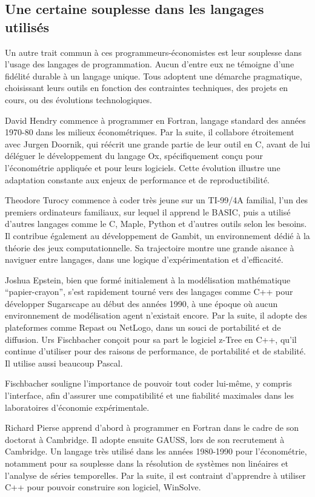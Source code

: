\subsection{Une certaine souplesse dans les langages utilisés}

Un autre trait commun à ces programmeurs-économistes est leur souplesse dans l’usage des langages de programmation. Aucun d’entre eux ne témoigne d'une fidélité durable à un langage unique. Tous adoptent une démarche pragmatique, choisissant leurs outils en fonction des contraintes techniques, des projets en cours, ou des évolutions technologiques. 

David Hendry commence à programmer en Fortran, langage standard des années 1970-80 dans les milieux économétriques. Par la suite, il collabore étroitement avec Jurgen Doornik, qui réécrit une grande partie de leur outil en C, avant de lui déléguer le développement du langage Ox, spécifiquement conçu pour l’économétrie appliquée et pour leurs logiciels. Cette évolution illustre une adaptation constante aux enjeux de performance et de reproductibilité. 

Theodore Turocy commence à coder très jeune sur un TI-99/4A familial, l'un des premiers ordinateurs familiaux, sur lequel il apprend le BASIC, puis a utilisé d'autres langages comme le C, Maple, Python et d’autres outils selon les besoins. Il contribue également au développement de Gambit, un environnement dédié à la théorie des jeux computationnelle. Sa trajectoire montre une grande aisance à naviguer entre langages, dans une logique d’expérimentation et d’efficacité. 

Joshua Epstein, bien que formé initialement à la modélisation mathématique “papier-crayon”, s’est rapidement tourné vers des langages comme C++ pour développer Sugarscape au début des années 1990, à une époque où aucun environnement de modélisation agent n’existait encore. Par la suite, il adopte des plateformes comme Repast ou NetLogo, dans un souci de portabilité et de diffusion. Urs Fischbacher conçoit pour sa part le logiciel z-Tree en C++, qu’il continue d’utiliser pour des raisons de performance, de portabilité et de stabilité. Il utilise aussi beaucoup Pascal. 

Fischbacher souligne l’importance de pouvoir tout coder lui-même, y compris l’interface, afin d’assurer une compatibilité et une fiabilité maximales dans les laboratoires d’économie expérimentale. 

Richard Pierse apprend d’abord à programmer en Fortran dans le cadre de son doctorat à Cambridge. Il adopte ensuite GAUSS, lors de son recrutement à Cambridge. Un langage très utilisé dans les années 1980-1990 pour l’économétrie, notamment pour sa souplesse dans la résolution de systèmes non linéaires et l’analyse de séries temporelles. Par la suite, il est contraint d'apprendre à utiliser C++ pour pouvoir construire son logiciel, WinSolve. 

